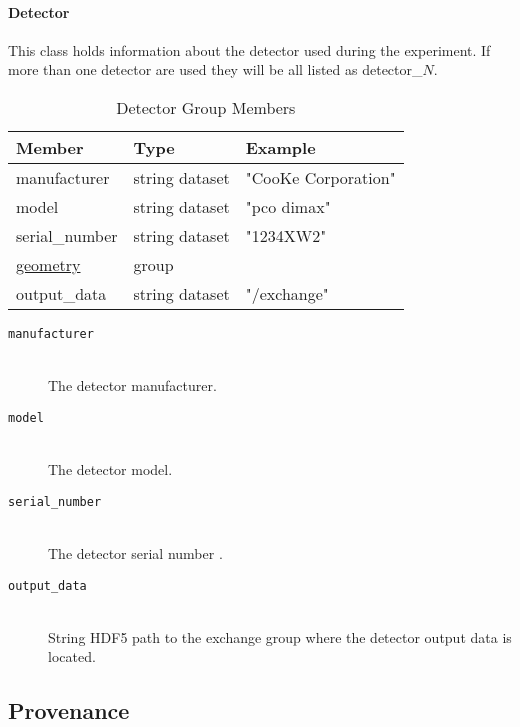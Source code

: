 \paragraph{Detector}
\label{table:detector}

This class holds information about the detector used during the experiment. 
If more than one detector are used they will be all listed as detector\_$N$.

\begin{table}[h!]\sffamily \footnotesize
\caption{Detector Group Members}

\begin{tabular}{p{3.5cm} p{4.7cm}  p{4.5cm} }
\toprule
\bfseries Member     & \bfseries Type & \bfseries Example \\
\midrule
manufacturer & string dataset & "CooKe Corporation" \\   
model & string dataset &  "pco dimax" \\
serial\_number & string dataset &  "1234XW2" \\  
\hyperref[table:geometry]{geometry} &  group & \\
output\_data & string dataset & "/exchange" \\
\bottomrule
\end{tabular}
\end{table}

\begin{description}
\item[\tt {manufacturer}] \hfill \\
{The detector manufacturer.}

\item[\tt {model}] \hfill \\
{The detector model.}

\item[\tt {serial\_number}] \hfill \\
{The detector serial number .}

\item[\tt {output\_data}] \hfill \\
{String HDF5 path to the exchange group where the detector output data is located.}
\end{description}

\newpage

\subsection{Provenance}
\label{section:provenance}

